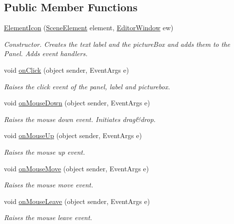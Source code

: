 \subsection*{Public Member Functions}
\begin{DoxyCompactItemize}
\item 
\hyperlink{class_a_rdev_kit_1_1_view_1_1_element_icon_a30833a0a71c8421f5309f6c384d1ad0b}{Element\-Icon} (\hyperlink{class_a_rdev_kit_1_1_controller_1_1_editor_controller_1_1_scene_element}{Scene\-Element} element, \hyperlink{class_a_rdev_kit_1_1_editor_window}{Editor\-Window} ew)
\begin{DoxyCompactList}\small\item\em Constructor. Creates the text label and the picture\-Box and adds them to the Panel. Adds event handlers. \end{DoxyCompactList}\item 
void \hyperlink{class_a_rdev_kit_1_1_view_1_1_element_icon_a58f9a858b7276f2e84a1c5ff53c0c2ad}{on\-Click} (object sender, Event\-Args e)
\begin{DoxyCompactList}\small\item\em Raises the click event of the panel, label and picturebox. \end{DoxyCompactList}\item 
void \hyperlink{class_a_rdev_kit_1_1_view_1_1_element_icon_a74260100df10dfa4c774560c5f5eb1f1}{on\-Mouse\-Down} (object sender, Event\-Args e)
\begin{DoxyCompactList}\small\item\em Raises the mouse down event. Initiates drag\&drop. \end{DoxyCompactList}\item 
void \hyperlink{class_a_rdev_kit_1_1_view_1_1_element_icon_a8d579f67f02edc591e947fa48e0bac75}{on\-Mouse\-Up} (object sender, Event\-Args e)
\begin{DoxyCompactList}\small\item\em Raises the mouse up event. \end{DoxyCompactList}\item 
void \hyperlink{class_a_rdev_kit_1_1_view_1_1_element_icon_a2eb3b81bfad03aacdeb5321c546c48de}{on\-Mouse\-Move} (object sender, Event\-Args e)
\begin{DoxyCompactList}\small\item\em Raises the mouse move event. \end{DoxyCompactList}\item 
void \hyperlink{class_a_rdev_kit_1_1_view_1_1_element_icon_a20687dd0ecb82c3ec17341ba01256f14}{on\-Mouse\-Leave} (object sender, Event\-Args e)
\begin{DoxyCompactList}\small\item\em Raises the mouse leave event. \end{DoxyCompactList}\end{DoxyCompactItemize}
